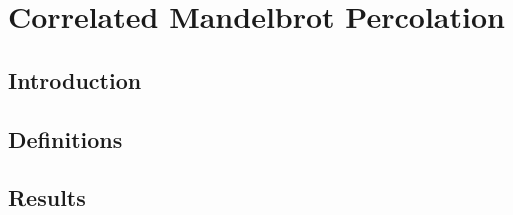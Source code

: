
\chapter{Correlated Mandelbrot Percolation} %

\label{ch:correlatedmandelbrot} %



\section{Introduction}\label{sec:introduction}



\section{Definitions}\label{sec:options}



\section{Results}\label{sec:results}
